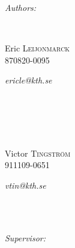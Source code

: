\documentclass[11pt]{article}
\begin{document}
\begin{titlepage}
\begin{minipage}{0.5\textwidth}\begin{flushleft}
\emph{Authors:}
\end{flushleft}\end{minipage}
\begin{minipage}{0.5\textwidth}\begin{flushleft} 
\end{flushleft}\end{minipage}\\
\begin{minipage}{0.5\textwidth}\begin{flushleft} 
Eric \textsc{Leijonmarck}\\
870820-0095\\
\end{flushleft}\end{minipage}
\begin{minipage}{0.5\textwidth}\begin{flushright} 
\textit{ericle@kth.se}\\
\end{flushright}\end{minipage}\\\\
\begin{minipage}{0.5\textwidth}\begin{flushleft} 
\end{flushleft}\end{minipage}\\
\begin{minipage}{0.5\textwidth}\begin{flushleft} 
Victor \textsc{Tingstr\"om}\\
911109-0651\\
\end{flushleft}\end{minipage}
\begin{minipage}{0.5\textwidth}\begin{flushright} 
\textit{vtin@kth.se}\\
\end{flushright}\end{minipage}\\\\
\begin{minipage}{0.5\textwidth}\begin{flushleft} 
\emph{Supervisor:}\\
\end{flushleft}\end{minipage}

\end{titlepage}
\end{document}
